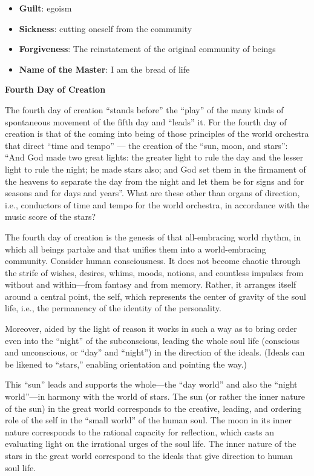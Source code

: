 \begin{itemize}
\item \textbf{Guilt}: egoism 
\item \textbf{Sickness}: cutting oneself from the community 
\item \textbf{Forgiveness}: The reinstatement of the original community of beings 
\item \textbf{Name of the Master}: I am the bread of life 
\end{itemize}
\textbf{Fourth Day of Creation}

The fourth day of creation “stands before” the “play” of the many kinds of spontaneous movement of the fifth day and
“leads” it. For the fourth day of creation is that of the coming into being of those principles of the world orchestra
that direct “time and tempo” — the creation of the “sun, moon, and stars”: “And God made two great
lights: the greater light to rule the day and the lesser light to rule the night; he made stars also; and God set them
in the firmament of the heavens to separate the day from the night and let them be for signs and for seasons and for
days and years”. What are these other than organs of direction, i.e., conductors of time and tempo for the world
orchestra, in accordance with the music score of the stars?

The fourth day of creation is the genesis of that all-embracing world rhythm, in which all beings partake and that
unifies them into a world-embracing community. Consider human consciousness. It does not become chaotic through the
strife of wishes, desires, whims, moods, notions, and countless impulses from without and
within—from fantasy and from memory. Rather, it arranges itself around a central point, the self,
which represents the center of gravity of the soul life, i.e., the permanency of the identity of the personality.

Moreover, aided by the light of reason it works in such a way as to bring order even into the “night” of the
subconscious, leading the whole soul life (conscious and unconscious, or “day” and “night”) in the direction of the
ideals. (Ideals can be likened to “stars,” enabling orientation and pointing the way.)

This “sun” leads and supports the whole—the “day world” and also the “night
world”—in harmony with the world of stars. The sun (or rather the inner nature of the sun) in the
great world corresponds to the creative, leading, and ordering role of the self in the “small world” of the human soul.
The moon in its inner nature corresponds to the rational capacity for reflection, which casts an evaluating light on
the irrational urges of the soul life. The inner nature of the stars in the great world correspond to the ideals that
give direction to human soul life.

